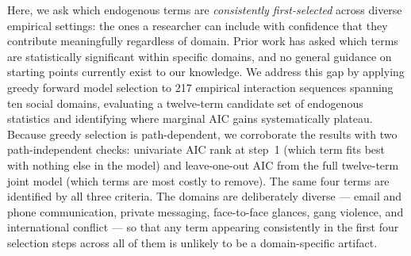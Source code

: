 \documentclass[11pt]{article}
\begin{document}
Here, we ask which endogenous terms are \emph{consistently first-selected}
across diverse empirical settings: the ones a researcher can include with
confidence that they contribute meaningfully regardless of domain. Prior
work has asked which terms are statistically significant within specific domains, and no general guidance on starting points currently exist to our knowledge. We address this gap by applying greedy
forward model selection to 217 empirical interaction sequences spanning
ten social domains, evaluating a twelve-term candidate set of endogenous
statistics and identifying where marginal AIC gains systematically plateau.
Because greedy selection is path-dependent, we corroborate the results with
two path-independent checks: univariate AIC rank at step~1 (which term fits
best with nothing else in the model) and leave-one-out AIC from the full
twelve-term joint model (which terms are most costly to remove). The same
four terms are identified by all three criteria.
The domains are deliberately diverse --- email and phone communication,
private messaging, face-to-face glances, gang violence, and international
conflict --- so that any term appearing consistently in the first four
selection steps across all of them is unlikely to be a domain-specific
artifact.
\end{document}
